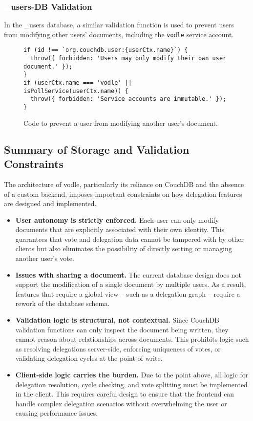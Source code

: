 \subsubsection{\_users-DB Validation}
In the \_users database, a similar validation function is used to prevent users from modifying other users' documents, including the \texttt{vodle} service account.
\begin{figure}[H]
\begin{verbatim}
if (id !== `org.couchdb.user:{userCtx.name}`) {
  throw({ forbidden: 'Users may only modify their own user document.' });
}
if (userCtx.name === 'vodle' || isPollService(userCtx.name)) {
  throw({ forbidden: 'Service accounts are immutable.' });
}
\end{verbatim}
\caption{Code to prevent a user from modifying another user's document.}
\end{figure}

\subsection{Summary of Storage and Validation Constraints}
\label{subsec:summary_storage_constraints}

The architecture of vodle, particularly its reliance on CouchDB and the absence of a custom backend, imposes important constraints on how delegation features are designed and implemented.

\begin{itemize}
  \item \textbf{User autonomy is strictly enforced.} Each user can only modify documents that are explicitly associated with their own identity. This guarantees that vote and delegation data cannot be tampered with by other clients but also eliminates the possibility of directly setting or managing another user's vote.

  \item \textbf{Issues with sharing a document.} The current database design does not support the modification of a single document by multiple users. As a result, features that require a global view -- such as a delegation graph -- require a rework of the database schema.

  \item \textbf{Validation logic is structural, not contextual.} Since CouchDB validation functions can only inspect the document being written, they cannot reason about relationships across documents. This prohibits logic such as resolving delegations server-side, enforcing uniqueness of votes, or validating delegation cycles at the point of write.

  \item \textbf{Client-side logic carries the burden.} Due to the point above, all logic for delegation resolution, cycle checking, and vote splitting must be implemented in the client. This requires careful design to ensure that the frontend can handle complex delegation scenarios without overwhelming the user or causing performance issues.
\end{itemize}

